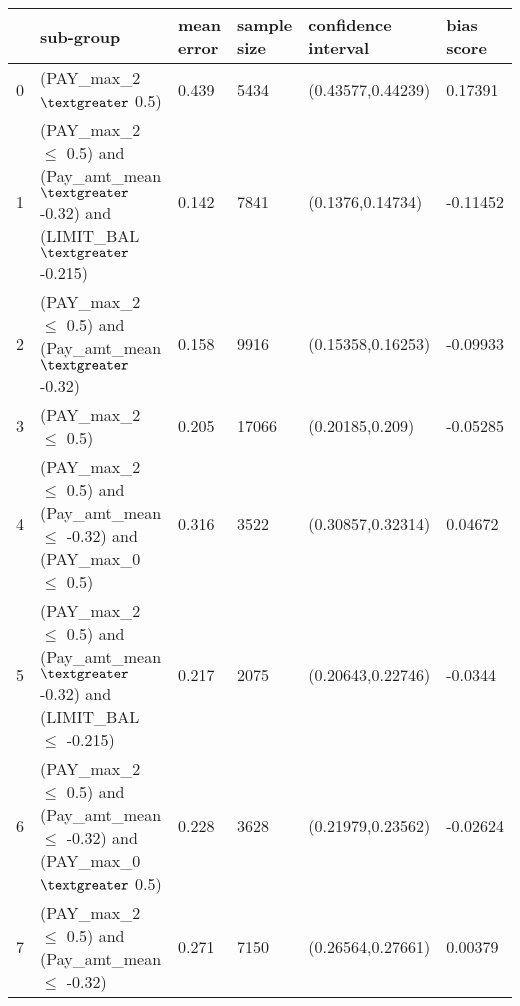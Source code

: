 \begin{tabular}{llllll}
\toprule
{} &                                                                sub-group & mean error & sample size & confidence interval & bias score \\
\midrule
0 &                                                        (PAY\_max\_2 $\textgreater$ 0.5) &      0.439 &        5434 &   (0.43577,0.44239) &    0.17391 \\
1 &   (PAY\_max\_2 $\leq$ 0.5) and (Pay\_amt\_mean $\textgreater$ -0.32) and (LIMIT\_BAL $\textgreater$ -0.215) &      0.142 &        7841 &    (0.1376,0.14734) &   -0.11452 \\
2 &                            (PAY\_max\_2 $\leq$ 0.5) and (Pay\_amt\_mean $\textgreater$ -0.32) &      0.158 &        9916 &   (0.15358,0.16253) &   -0.09933 \\
3 &                                                       (PAY\_max\_2 $\leq$ 0.5) &      0.205 &       17066 &     (0.20185,0.209) &   -0.05285 \\
4 &    (PAY\_max\_2 $\leq$ 0.5) and (Pay\_amt\_mean $\leq$ -0.32) and (PAY\_max\_0 $\leq$ 0.5) &      0.316 &        3522 &   (0.30857,0.32314) &    0.04672 \\
5 &  (PAY\_max\_2 $\leq$ 0.5) and (Pay\_amt\_mean $\textgreater$ -0.32) and (LIMIT\_BAL $\leq$ -0.215) &      0.217 &        2075 &   (0.20643,0.22746) &    -0.0344 \\
6 &     (PAY\_max\_2 $\leq$ 0.5) and (Pay\_amt\_mean $\leq$ -0.32) and (PAY\_max\_0 $\textgreater$ 0.5) &      0.228 &        3628 &   (0.21979,0.23562) &   -0.02624 \\
7 &                           (PAY\_max\_2 $\leq$ 0.5) and (Pay\_amt\_mean $\leq$ -0.32) &      0.271 &        7150 &   (0.26564,0.27661) &    0.00379 \\
\bottomrule
\end{tabular}
